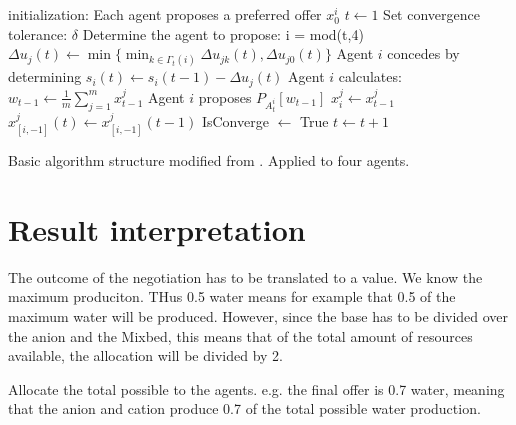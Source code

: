 \begin{algorithm}[h]
	initialization: Each agent proposes a preferred offer $x^i_0$\;
	$t\leftarrow1$\;
	Set convergence tolerance: $\delta$\;
	{
		Determine the agent to propose: i = mod(t,4)\;
		{
			{
				{
					$\Delta u_j(t)\leftarrow \min \{\min_{k\in\Gamma_t(i)}\Delta u_{jk}(t), \Delta u_{j0}(t)\}$ \;	
				}
				Agent $i$ concedes by determining $s_i(t)\leftarrow s_i(t-1)-\Delta u_j(t)$\;
				Agent $i$ calculates: $w_{t-1}\leftarrow \frac{1}{m}\sum_{j=1}^{m}x^j_{t-1}$\;
				Agent $i$ proposes $P_{A^i_t}[w_{t-1}]$\;
			}{
				$x^j_i \leftarrow x^j_{t-1}$\;
				$x^j_{[i,-1]}(t) \leftarrow x^j_{[i,-1]}(t-1)$\;
			}
		}
		{
			IsConverge $\leftarrow $ True\;
		}{
			$t \leftarrow t+1$\;
		}
	}
\caption{Basic algorithm structure modified from \citep{zheng2015automated}. Applied to four agents.}
\label{al:algorithm1}
\end{algorithm}
\clearpage
\section{Result interpretation}
\label{sec:design:mean}
The outcome of the negotiation has to be translated to a value. We know the maximum produciton. THus 0.5 water means for example that 0.5 of the maximum water will be produced. However, since the base has to be divided over the anion and the Mixbed, this means that of the total amount of resources available, the allocation will be divided by 2. 

Allocate the total possible to the agents. e.g. the final offer is 0.7 water, meaning that the anion and cation produce 0.7 of the total possible water production. 

